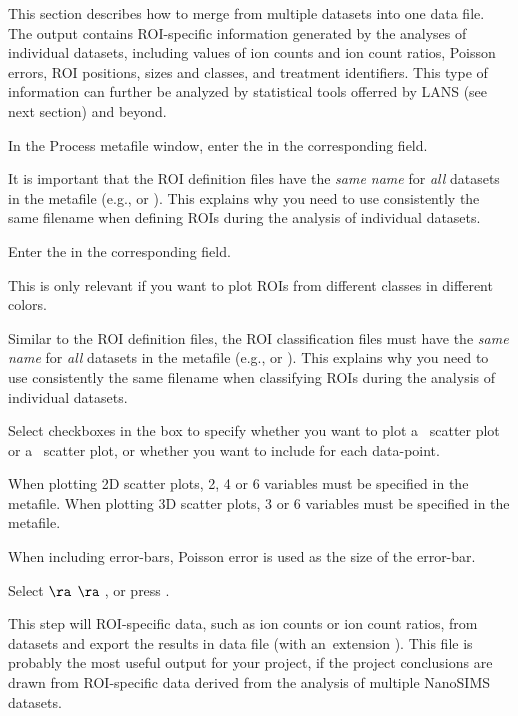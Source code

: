 This section describes how to merge  from multiple datasets into one data file. The output contains ROI-specific information generated by the analyses of individual datasets, including values of ion counts and ion count ratios, Poisson errors, ROI positions, sizes and classes, and treatment identifiers. This type of information can further be analyzed by statistical tools offerred by LANS (see next section) and beyond.

\s In the Process metafile window, enter the  in the corresponding field.

\bul It is important that the ROI definition files have the \emph{same name} for \emph{all} datasets in the metafile (e.g.,  or ). This explains why you need to use consistently the same filename when defining ROIs during the analysis of individual datasets.

\s Enter the  in the corresponding field.

\bul This is only relevant if you want to plot ROIs from different classes in different colors.

\bul Similar to the ROI definition files, the ROI classification files must have the \emph{same name} for \emph{all} datasets in the metafile (e.g.,  or ). This explains why you need to use consistently the same filename when classifying ROIs during the analysis of individual datasets.

\s Select checkboxes in the  box to specify whether you want to plot a~ scatter plot or a~ scatter plot, or whether you want to include  for each data-point. 

\bul When plotting 2D scatter plots, 2, 4 or 6 variables must be specified in the metafile. When plotting 3D scatter plots, 3 or 6 variables must be specified in the metafile. 

\bul When including error-bars, Poisson error is used as the size of the error-bar.

\s Select  $\ra$  $\ra$ , or press .

\bul This step will  ROI-specific data, such as ion counts or ion count ratios, from  datasets and export the results in  data file (with an~extension ). This file is probably the most useful output for your project, if the project conclusions are drawn from ROI-specific data derived from the analysis of multiple NanoSIMS datasets.

